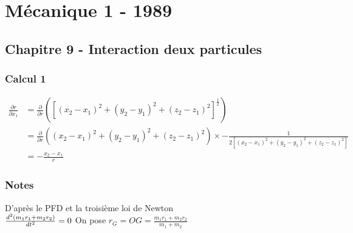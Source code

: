 \documentclass[11pt,a4paper]{article}
\begin{document}
\tableofcontents

\section{Mécanique 1 - 1989}

\subsection{Chapitre 9 - Interaction deux particules}

\subsubsection{Calcul 1}

\begin{align*}
\frac{\partial r}{\partial x_1} &= \frac{\partial}{\partial r}([(x_2-x_1)^2+(y_2-y_1)^2+(z_2-z_1)^2]^\frac{1}{2})\\
&=\frac{\partial}{\partial r}((x_2-x_1)^2+(y_2-y_1)^2+(z_2-z_1)^2)\times-\frac{1}{2[(x_2-x_1)^2+(y_2-y_1)^2+(z_2-z_1)^2]}\\
&=-\frac{x_2-x_1}{r}
\end{align*}

\subsubsection{Notes}
D'après le PFD et la troisième loi de Newton\\
$
\frac{d^2(m_1r_1+m_2r_2)}{dt^2}=0\\
$
On pose
$
r_G=OG=\frac{m_1r_1+m_2r_2}{m_1+m_2}
$
\end{document}
